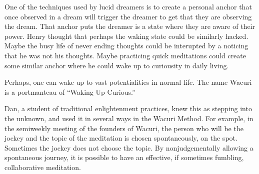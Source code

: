\documentclass[12pt]{book}
\begin{document}
One of the techniques used by lucid dreamers is to create a personal
anchor that once observed in a dream will trigger the dreamer to get
that they are observing the dream. That anchor puts the dreamer is a
state where they are aware of their power. Henry thought that perhaps
the waking state could be similarly hacked. Maybe the busy life of
never ending thoughts could be interupted by a noticing that he was
not his thoughts. Maybe practicing quick meditations could create some
similar anchor where he could wake up to curiousity in daily living.

Perhaps, one can wake up to vast potentialities in normal life. The name Wacuri is a portmanteau of ``Waking Up Curious.''

Dan, a student of traditional enlightenment practices, knew this
as stepping into the unknown, and used it in several ways
in the Wacuri Method.  For example, in the semiweekly meeting of the founders of
Wacuri, the person who will be the jockey and the topic of the meditation
is chosen spontaneously, on the
spot. Sometimes the jockey does not choose the topic. By nonjudgementally
allowing a spontaneous journey, it is possible to have an
effective, if sometimes fumbling, collaborative meditation.
\end{document}
